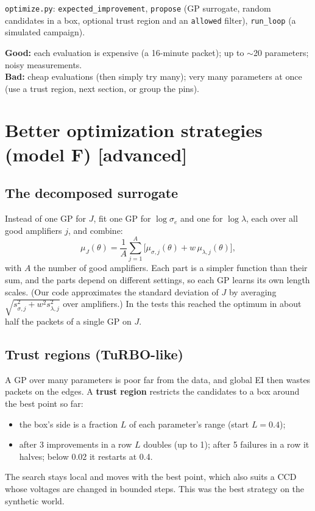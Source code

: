 \documentclass[11pt]{article}
\newcommand{\code}[1]{\texttt{#1}}
\newcommand{\level}[1]{\hfill{\normalfont\small\color{black!60}[#1]}}
\begin{document}
\begin{ours}
\code{optimize.py}: \code{expected\_improvement}, \code{propose} (GP surrogate, random candidates in a box, optional trust region and
an \code{allowed} filter), \code{run\_loop} (a simulated campaign).
\end{ours}

\begin{when}
\textbf{Good:} each evaluation is expensive (a 16-minute packet); up to $\sim$20 parameters; noisy measurements.\\
\textbf{Bad:} cheap evaluations (then simply try many); very many parameters at once (use a trust region, next section, or
group the pins).
\end{when}

\section{Better optimization strategies (model F) \level{advanced}}
\label{sec:bof}

\subsection{The decomposed surrogate}
Instead of one GP for $J$, fit one GP for $\log\sigma_e$ and one for $\log\lambda$, each over all good amplifiers $j$, and combine:
\begin{equation}
\mu_J(\theta) = \frac{1}{A}\sum_{j=1}^{A}\bigl[\mu_{\sigma,j}(\theta) + w\,\mu_{\lambda,j}(\theta)\bigr],
\end{equation}
with $A$ the number of good amplifiers. Each part is a simpler function than their sum, and the parts depend on different
settings, so each GP learns its own length scales. (Our code approximates the standard deviation of $J$ by averaging
$\sqrt{s_{\sigma,j}^2 + w^2 s_{\lambda,j}^2}$ over amplifiers.) In the tests this reached the optimum in about half the packets of a
single GP on $J$.

\subsection{Trust regions (TuRBO-like)}
A GP over many parameters is poor far from the data, and global EI then wastes packets on the edges. A \textbf{trust region}
restricts the candidates to a box around the best point so far:
\begin{itemize}
\item the box's side is a fraction $L$ of each parameter's range (start $L = 0.4$);
\item after 3 improvements in a row $L$ doubles (up to 1); after 5 failures in a row it halves; below 0.02 it restarts at 0.4.
\end{itemize}
The search stays local and moves with the best point, which also suits a CCD whose voltages are changed in bounded steps. This was
the best strategy on the synthetic world.
\end{document}
